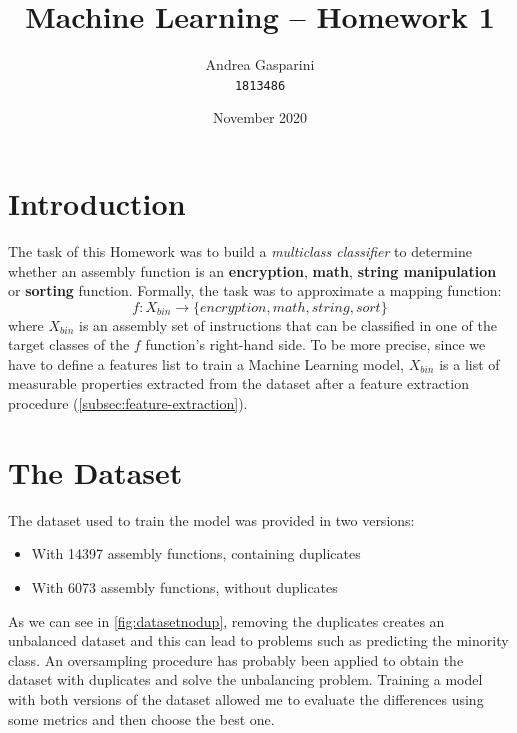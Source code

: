 \documentclass[11pt]{article}
\title{Machine Learning -- Homework 1}
\author{Andrea Gasparini \\ \texttt{1813486}}
\date{November 2020}
\begin{document}
	\maketitle

	\tableofcontents	

	\newpage


	\section{Introduction}
	The task of this Homework was to build a \textit{multiclass classifier} to
	determine whether an assembly function is an \textbf{encryption}, \textbf{math},
	\textbf{string manipulation} or \textbf{sorting} function.
	Formally, the task was to approximate a mapping function:
	\begin{equation} \label{eq:mapping-function}
		f : X_{bin} \rightarrow \{ encryption, math, string, sort \}		
	\end{equation}
	where $ X_{bin} $ is an assembly set of instructions that can be classified
	in one of the target classes of the $ f $ function's right-hand side.
	To be more precise, since we have to define a features list to train a
	Machine Learning model, $ X_{bin} $ is a list of measurable properties
	extracted from the dataset after a feature extraction procedure
	(\autoref{subsec:feature-extraction}).



	\section{The Dataset}
	The dataset used to train the model was provided in two versions:
	\begin{itemize}
		\item With 14397 assembly functions, containing duplicates
		\item With 6073 assembly functions, without duplicates
	\end{itemize}
	As we can see in \autoref{fig:datasetnodup}, removing the duplicates creates
	an unbalanced dataset and this can lead to problems such as predicting the minority
	class. An oversampling procedure has probably been applied to obtain
	the dataset with duplicates and solve the unbalancing problem.
	Training a model with both versions of the dataset allowed me to evaluate the
	differences using some metrics and then choose the best one.
\end{document}
